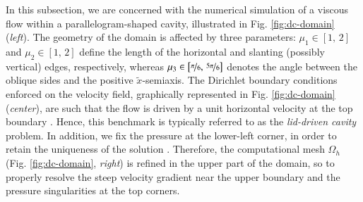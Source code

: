 \documentclass[longtitle]{elsarticle}
\numberwithin{equation}{section}
\theoremstyle{theorem}
\theoremstyle{definition}
\theoremstyle{remark}
\theoremstyle{proposition}
\numberwithin{figure}{section}
\newcommand{\wt}[1]{\widetilde{#1}}
\begin{document}
		In this subsection, we are concerned with the numerical simulation of a viscous flow within a parallelogram-shaped cavity, illustrated in Fig. \ref{fig:dc-domain} (\emph{left}). The geometry of the domain is affected by three parameters: $\mu_1 \in [1, \, 2]$ and $\mu_2 \in [1, \, 2]$ define the length of the horizontal and slanting (possibly vertical) edges, respectively, whereas $\mu_3 \in \big[ \nicefrac{\pi}{6}, \, \nicefrac{5 \pi}{6} \big]$ denotes the angle between the oblique sides and the positive $\wt{x}$-semiaxis. The Dirichlet boundary conditions enforced on the velocity field, graphically represented in Fig. \ref{fig:dc-domain} (\emph{center}), are such that the flow is driven by a unit horizontal velocity at the top boundary \cite{Per02}. Hence, this benchmark is typically referred to as the \emph{lid-driven cavity} problem. In addition, we fix the pressure at the lower-left corner, in order to retain the uniqueness of the solution \cite{Dho14}. Therefore, the computational mesh $\Omega_h$ (Fig. \ref{fig:dc-domain}, \emph{right}) is refined in the upper part of the domain, so to properly resolve the steep velocity gradient near the upper boundary and the pressure singularities at the top corners. 		
\end{document}
